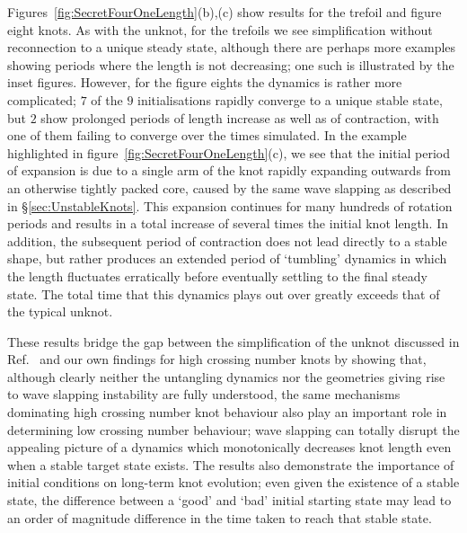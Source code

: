 Figures~\ref{fig:SecretFourOneLength}(b),(c) show results for the trefoil and figure eight knots. As with the unknot, for the trefoils we see simplification without reconnection to a unique steady state, although there are perhaps more examples showing periods where the length is not decreasing; one such is illustrated by the inset figures. However, for the figure eights the dynamics is rather more complicated; $7$ of the $9$ initialisations rapidly converge to a unique stable state, but $2$ show prolonged periods of length increase as well as of contraction, with one of them failing to converge over the times simulated. In the example highlighted in figure~\ref{fig:SecretFourOneLength}(c), we see that the initial period of expansion is due to a single arm of the knot rapidly expanding outwards from an otherwise tightly packed core, caused by the same wave slapping as described in \S\ref{sec:UnstableKnots}. This expansion continues for many hundreds of rotation periods and results in a total increase of several times the initial knot length. In addition, the subsequent period of contraction does not lead directly to a stable shape, but rather produces an extended period of `tumbling' dynamics in which the length fluctuates erratically before eventually settling to the final steady state. The total time that this dynamics plays out over greatly exceeds that of the typical unknot. 

These results bridge the gap between the simplification of the unknot discussed in Ref.~\citep{Maucher2016} and our own findings for high crossing number knots by showing that, although clearly neither the untangling dynamics nor the geometries giving rise to wave slapping instability are fully understood, the same mechanisms dominating high crossing number knot behaviour also play an important role in determining low crossing number behaviour; wave slapping can totally disrupt the appealing picture of a dynamics which monotonically decreases knot length even when a stable target state exists. The results also demonstrate the importance of initial conditions on long-term knot evolution; even given the existence of a stable state, the difference between a `good' and `bad' initial starting state may lead to an order of magnitude difference in the time taken to reach that stable state. 

